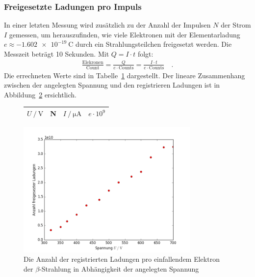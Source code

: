 \subsubsection{Freigesetzte Ladungen pro Impuls}
In einer letzten Messung wird zusätzlich zu der Anzahl der Impulsen $N$ der Strom $I$ gemessen, um herauszufinden, wie viele Elektronen mit der Elementarladung $e \approx  \SI{-1.602e-19}{\coulomb}$ durch ein Strahlungsteilchen freigesetzt werden. Die Messzeit beträgt 10 Sekunden. Mit $Q =  I \cdot t$ folgt:
\begin{align}
	\frac{\mathrm{Elekronen}}{\mathrm{Count}} = \frac{Q }{e \cdot \mathrm{Counts}} = \frac{I \cdot t }{e \cdot \mathrm{Counts}} \quad .
\end{align}
Die errechneten Werte sind in Tabelle~\ref{tab:ladungen} dargestellt. Der lineare Zusammenhang zwischen der angelegten Spannung und den registrieren Ladungen ist in Abbildung~\ref{fig:anzahl_elektronen} ersichtlich.



	 \begin{figure}[h!]
	 	\centering
	 	\begin{tabular}{cccc}
	 		$U \ /\  \mathrm{V}$ & N &  $I \ /\  \si{\micro\ampere}$ & $e \cdot 10^9$ \\
	 		\hline
	 		
	 	\end{tabular}
	 	\label{tab:ladungen}
	 \end{figure}
	 
	 \begin{figure}[h!]
	 	\centering
	 	\includegraphics[width=0.8\textwidth]{build/anzahl_elektronen.png}
	 	\caption{Die Anzahl der registrierten Ladungen pro einfallendem Elektron der $\beta$-Strahlung in Abhängigkeit der angelegten Spannung}
	 	\label{fig:anzahl_elektronen}
	 \end{figure}




	
	